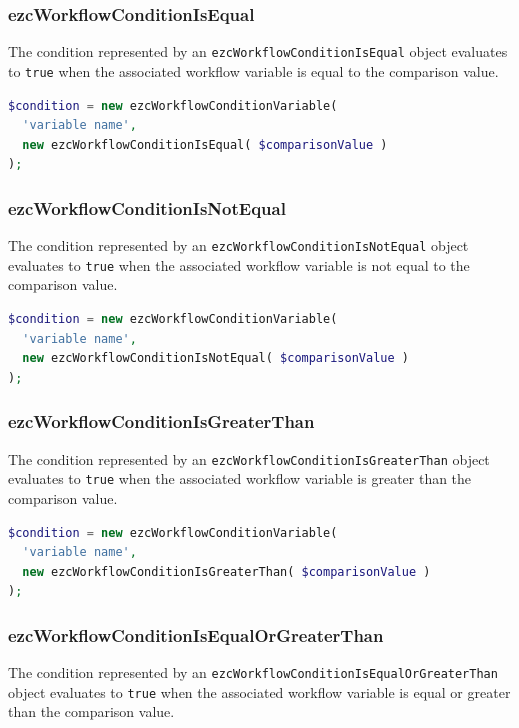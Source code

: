 \subsubsection{ezcWorkflowConditionIsEqual}

The condition represented by an \texttt{ezcWorkflowConditionIsEqual} object
evaluates to \texttt{true} when the associated workflow variable is equal to
the comparison value.

\begin{lstlisting}[language=PHP]
$condition = new ezcWorkflowConditionVariable(
  'variable name',
  new ezcWorkflowConditionIsEqual( $comparisonValue )
);
\end{lstlisting}

\subsubsection{ezcWorkflowConditionIsNotEqual}

The condition represented by an \texttt{ezcWorkflowConditionIsNotEqual} object
evaluates to \texttt{true} when the associated workflow variable is not equal
to the comparison value.

\begin{lstlisting}[language=PHP]
$condition = new ezcWorkflowConditionVariable(
  'variable name',
  new ezcWorkflowConditionIsNotEqual( $comparisonValue )
);
\end{lstlisting}

\subsubsection{ezcWorkflowConditionIsGreaterThan}

The condition represented by an \texttt{ezcWorkflowConditionIsGreaterThan}
object evaluates to \texttt{true} when the associated workflow variable is
greater than the comparison value.

\begin{lstlisting}[language=PHP]
$condition = new ezcWorkflowConditionVariable(
  'variable name',
  new ezcWorkflowConditionIsGreaterThan( $comparisonValue )
);
\end{lstlisting}

\subsubsection{ezcWorkflowConditionIsEqualOrGreaterThan}

The condition represented by an \texttt{ezcWorkflowConditionIsEqualOrGreaterThan}
object evaluates to \texttt{true} when the associated workflow variable is
equal or greater than the comparison value.

